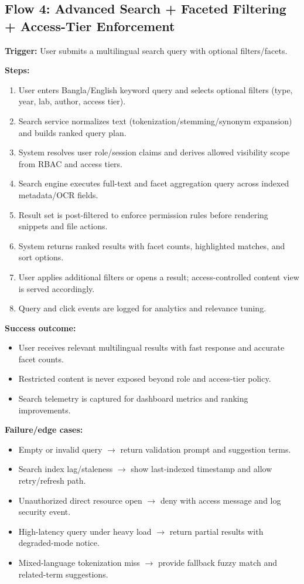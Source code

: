 \documentclass[12pt,a4paper]{article}
\begin{document}
\subsection*{Flow 4: Advanced Search + Faceted Filtering + Access-Tier Enforcement}
\textbf{Trigger:} User submits a multilingual search query with optional filters/facets.

\textbf{Steps:}
\begin{enumerate}
    \item User enters Bangla/English keyword query and selects optional filters (type, year, lab, author, access tier).
    \item Search service normalizes text (tokenization/stemming/synonym expansion) and builds ranked query plan.
    \item System resolves user role/session claims and derives allowed visibility scope from RBAC and access tiers.
    \item Search engine executes full-text and facet aggregation query across indexed metadata/OCR fields.
    \item Result set is post-filtered to enforce permission rules before rendering snippets and file actions.
    \item System returns ranked results with facet counts, highlighted matches, and sort options.
    \item User applies additional filters or opens a result; access-controlled content view is served accordingly.
    \item Query and click events are logged for analytics and relevance tuning.
\end{enumerate}

\textbf{Success outcome:}
\begin{itemize}
    \item User receives relevant multilingual results with fast response and accurate facet counts.
    \item Restricted content is never exposed beyond role and access-tier policy.
    \item Search telemetry is captured for dashboard metrics and ranking improvements.
\end{itemize}

\textbf{Failure/edge cases:}
\begin{itemize}
    \item Empty or invalid query $\rightarrow$ return validation prompt and suggestion terms.
    \item Search index lag/staleness $\rightarrow$ show last-indexed timestamp and allow retry/refresh path.
    \item Unauthorized direct resource open $\rightarrow$ deny with access message and log security event.
    \item High-latency query under heavy load $\rightarrow$ return partial results with degraded-mode notice.
    \item Mixed-language tokenization miss $\rightarrow$ provide fallback fuzzy match and related-term suggestions.
\end{itemize}
\end{document}
